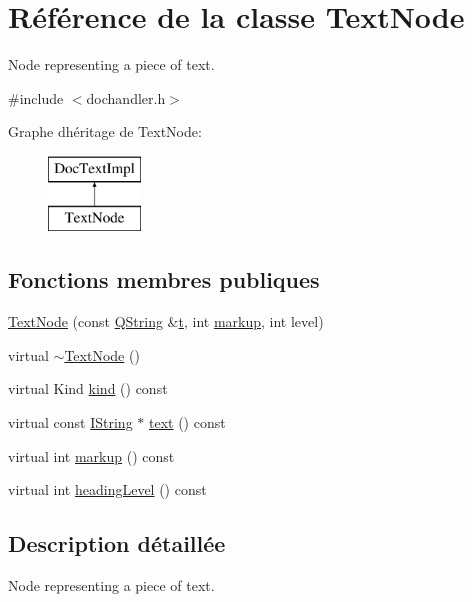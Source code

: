 \hypertarget{class_text_node}{}\section{Référence de la classe Text\+Node}
\label{class_text_node}


Node representing a piece of text.  




{\ttfamily \#include $<$dochandler.\+h$>$}

Graphe d\textquotesingle{}héritage de Text\+Node\+:\begin{figure}[H]
\begin{center}
\leavevmode
\includegraphics[height=2.000000cm]{class_text_node}
\end{center}
\end{figure}
\subsection*{Fonctions membres publiques}
\begin{DoxyCompactItemize}
\item 
\hyperlink{class_text_node_ab1a635984f5b460827c346ce7742a0b4}{Text\+Node} (const \hyperlink{class_q_string}{Q\+String} \&\hyperlink{058__bracket__recursion_8tcl_a69e959f6901827e4d8271aeaa5fba0fc}{t}, int \hyperlink{class_text_node_a85399c116fa1c04b8e6e21e45e2154f6}{markup}, int level)
\item 
virtual \hyperlink{class_text_node_a98e2a848f756c8403c9ead8693603dc1}{$\sim$\+Text\+Node} ()
\item 
virtual Kind \hyperlink{class_text_node_a5536e652e64c750b643bd73510696260}{kind} () const 
\item 
virtual const \hyperlink{class_i_string}{I\+String} $\ast$ \hyperlink{class_text_node_a12a28425fe5ca34cb93b5db8ae49a49e}{text} () const 
\item 
virtual int \hyperlink{class_text_node_a85399c116fa1c04b8e6e21e45e2154f6}{markup} () const 
\item 
virtual int \hyperlink{class_text_node_afcd4e950d00318c196eb01a9b9a21422}{heading\+Level} () const 
\end{DoxyCompactItemize}


\subsection{Description détaillée}
Node representing a piece of text. 



